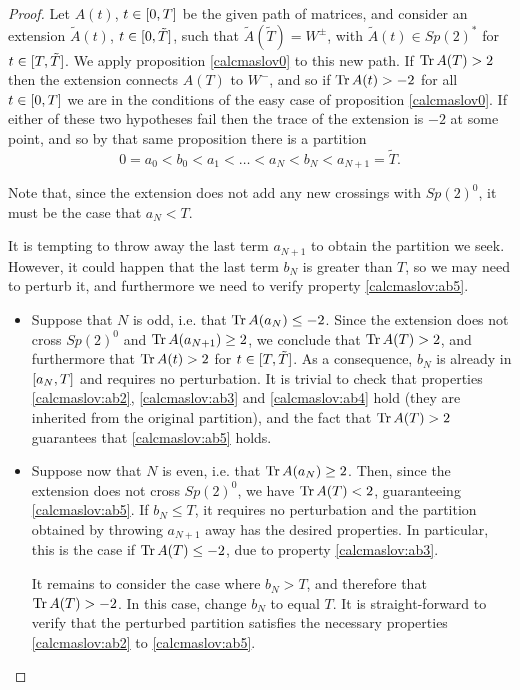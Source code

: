 \begin{proof}
Let $A(t)$, $t \in \interval 0 T$ be the given path of matrices, and consider an extension $\tilde A(t)$, $t \in \interval 0 {\tilde T}$, such that $\tilde A(\tilde T) = W^\pm$, with $\tilde A(t) \in Sp(2)^*$ for $t \in \interval T {\tilde T}$. We apply proposition \ref{calcmaslov0} to this new path. If $\operatorname{Tr} A(T) > 2$ then the extension connects $A(T)$ to $W^-$, and so if $\operatorname{Tr} A(t) > -2$ for all $t \in \interval 0 T$ we are in the conditions of the easy case of proposition \ref{calcmaslov0}. If either of these two hypotheses fail then the trace of the extension is $-2$ at some point, and so by that same proposition there is a partition
\begin{equation}
0 = a_0 < b_0 < a_1 < \dots < a_{N} < b_{N} < a_{N+1} = \tilde T.
\end{equation}

Note that, since the extension does not add any new crossings with $Sp(2)^0$, it must be the case that $a_{N} < T$.

It is tempting to throw away the last term $a_{N+1}$ to obtain the partition we seek. However, it could happen that the last term $b_N$ is greater than $T$, so we may need to perturb it, and furthermore we need to verify property \ref{calcmaslov:ab5}.

\begin{itemize}
\item Suppose that $N$ is odd, i.e. that $\operatorname{Tr} A(a_N) \leq -2$. Since the extension does not cross $Sp(2)^0$ and $\operatorname{Tr} A(a_{N+1}) \geq 2$, we conclude that $\operatorname{Tr} A(T) > 2$, and furthermore that $\operatorname{Tr} A(t) > 2$ for $t \in \interval T {\tilde T}$. As a consequence, $b_N$ is already in $\interval{a_N}T$ and requires no perturbation. It is trivial to check that properties \ref{calcmaslov:ab2}, \ref{calcmaslov:ab3} and \ref{calcmaslov:ab4} hold (they are inherited from the original partition), and the fact that $\operatorname{Tr} A(T) > 2$ guarantees that \ref{calcmaslov:ab5} holds.

\item Suppose now that $N$ is even, i.e. that $\operatorname{Tr} A(a_N) \geq 2$. Then, since the extension does not cross $Sp(2)^0$, we have $\operatorname{Tr} A(T) < 2$, guaranteeing \ref{calcmaslov:ab5}. If $b_N \leq T$, it requires no perturbation and the partition obtained by throwing $a_{N+1}$ away has the desired properties. In particular, this is the case if $\operatorname{Tr} A(T) \leq -2$, due to property \ref{calcmaslov:ab3}.

It remains to consider the case where $b_N > T$, and therefore that $\operatorname{Tr} A(T) > -2$. In this case, change $b_N$ to equal $T$. It is straight-forward to verify that the perturbed partition satisfies the necessary properties \ref{calcmaslov:ab2} to \ref{calcmaslov:ab5}.
\end{itemize}


\end{proof}
